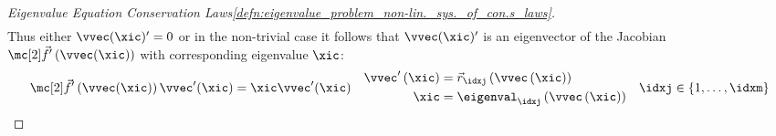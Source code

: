 \begin{proofbox}
\begin{proof}[Eigenvalue Equation Conservation Laws\cref{defn:eigenvalue_problem_non-lin._sys._of_con.s_laws}]
\begin{align*}
        \end{align*}
        Thus either $\vvec(\xic)'=0$ or in the non-trivial case it follows that $\vvec(\xic)'$ is an eigenvector of the Jacobian
        $\fluxvec'\left(\vvec(\xic)\right)$ with corresponding eigenvalue $\xic$:
        \begin{align}
          \fluxvec'\left(\vvec(\xic)\right)\vvec'(\xic)=\xic\vvec'(\xic)&&
          \begin{aligned}
                \vvec'\left(\xic\right)&=\vec{r}_{\idxj}\left(\vvec\left(\xic\right)\right)\\
                \xic&=\eigenval_{\idxj}\left(\vvec\left(\xic\right)\right)
          \end{aligned}&&\idxj\in \left\{1,\ldots,\idxm\right\}\label{eq:eigenvalue_problem_simple_solutions}
        \end{align}
    \end{proof}
\end{proofbox}
